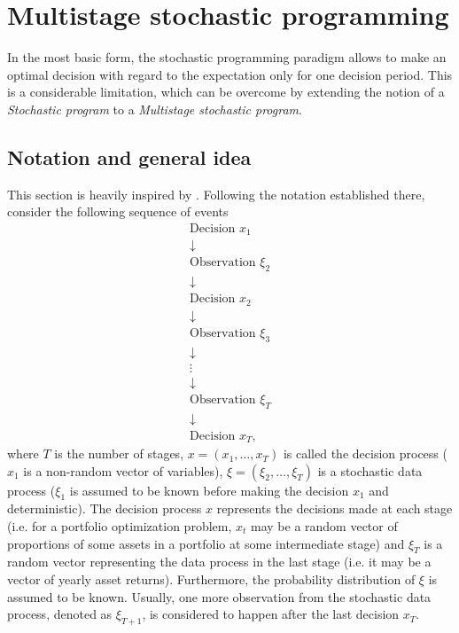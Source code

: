 \section{Multistage stochastic programming}
In the most basic form, the stochastic programming paradigm allows to make an optimal decision with regard to the expectation only for one decision period. This is a considerable limitation, which can be overcome by extending the notion of a \textit{Stochastic program} to a \textit{Multistage stochastic program}.

\subsection{Notation and general idea}
This section is heavily inspired by \cite[Section 3.3.]{stochasticprogrammingbible}.
Following the notation established there, consider the following sequence of events
\begin{equation*}
\begin{gathered}
\mathrm{Decision} \, \, x_1
\\
\downarrow
\\
\mathrm{Observation} \,\, \xi_2
\\
\downarrow
\\
\mathrm{Decision} \,\, x_2
\\
\downarrow
\\
\mathrm{Observation} \,\, \xi_3
\\
\downarrow
\\
\vdots
\\
\downarrow
\\
\mathrm{Observation} \,\, \xi_T
\\
\downarrow
\\
\mathrm{Decision} \,\, x_T,
\end{gathered}
\end{equation*}
where $T$ is the number of stages, $x=(x_1,\dots,x_T)$ is called the decision process ($x_1$ is a non-random vector of variables), $\xi = (\xi_2,\dots,\xi_{T})$ is a stochastic data process ($\xi_1$ is assumed to be known before making the decision $x_1$ and deterministic).  The decision process $x$ represents the decisions made at each stage (i.e. for a portfolio optimization problem, $x_t$ may be a random vector of proportions of some assets in a portfolio at some intermediate stage) and $\xi_{T}$ is a random vector representing the data process in the last stage (i.e. it may be a vector of yearly asset returns). Furthermore, the probability distribution of $\xi$ is assumed to be known. Usually, one more observation from the stochastic data process, denoted as $\xi_{T+1}$, is considered to happen after the last decision $x_T$.
